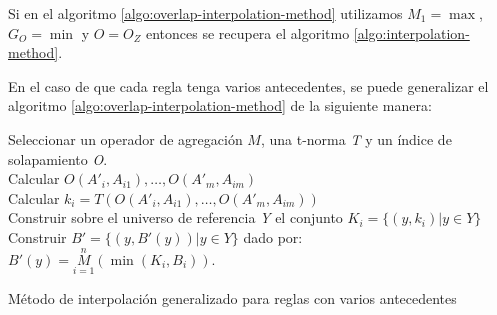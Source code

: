 Si en el algoritmo \ref{algo:overlap-interpolation-method} utilizamos $M_{1} = \max$, $G_{O} = \min$ y $O = O_{Z}$ entonces se recupera el algoritmo \ref{algo:interpolation-method}.

En el caso de que cada regla tenga varios antecedentes, se puede generalizar el algoritmo \ref{algo:overlap-interpolation-method} de la siguiente manera:

\begin{algorithm}
\DontPrintSemicolon
{}
\vspace{0.4 cm}
Seleccionar un operador de agregación $M$, una t-norma \emph{T} y un índice de solapamiento \emph{O}.\\
 {
Calcular $O(A'_{i}, A_{i1}),\ldots,O(A'_{m}, A_{im})$\\
Calcular $k_{i} = T(O(A'_{i}, A_{i1}),\ldots,O(A'_{m}, A_{im}))$\\
Construir sobre el universo de referencia \emph{Y} el conjunto $K_{i} = \{(y,k_{i})|y \in Y\}$
}
Construir $B' = \{(y, B'(y))|y \in Y\}$ dado por: \\
\centering
\nonl $B'(y) = \overset{n}{\underset{i=1}{M}}(\min(K_{i},B_{i}))$.\\
\;
\caption{Método de interpolación generalizado para reglas con varios antecedentes}
\label{algo:multi-overlap-interpolation-method}
\end{algorithm}

